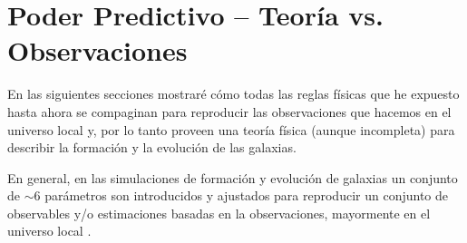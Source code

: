 \documentclass{article}
\begin{document}
\section{Poder Predictivo -- Teoría vs. Observaciones}
%
En las siguientes secciones mostraré cómo todas las reglas físicas que he expuesto hasta ahora se
compaginan para reproducir las observaciones que hacemos en el universo local y, por lo tanto
proveen una teoría física (aunque incompleta) para describir la formación y la evolución de las
galaxias.

En general, en las simulaciones de formación y evolución de galaxias un conjunto de $\sim6$
parámetros son introducidos y ajustados para reproducir un conjunto de observables y/o estimaciones
basadas en la observaciones, mayormente en el universo local \citep{Somerville2015, Guo2016,
Naab2016}.
\end{document}
